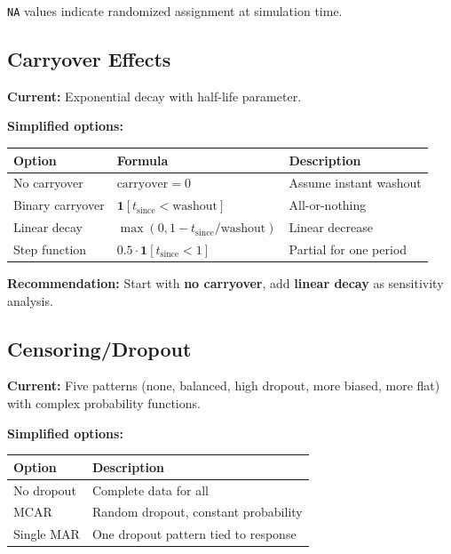 \documentclass[11pt,letterpaper]{article}
\begin{document}
\texttt{NA} values indicate randomized assignment at simulation time.


\subsection{Carryover Effects}

\textbf{Current:} Exponential decay with half-life parameter.

\textbf{Simplified options:}

\begin{table}[h]
\centering\small
\begin{tabular}{@{}L{3cm}L{5.5cm}L{4.5cm}@{}}
\toprule
Option & Formula & Description \\
\midrule
No carryover & $\text{carryover} = 0$ & Assume instant washout \\
Binary carryover & $\mathbf{1}[t_{\text{since}} < \text{washout}]$ & All-or-nothing \\
Linear decay & $\max(0, 1 - t_{\text{since}}/\text{washout})$ & Linear decrease \\
Step function & $0.5 \cdot \mathbf{1}[t_{\text{since}} < 1]$ & Partial for one period \\
\bottomrule
\end{tabular}
\end{table}

\textbf{Recommendation:} Start with \textbf{no carryover}, add
\textbf{linear decay} as sensitivity analysis.


\subsection{Censoring/Dropout}

\textbf{Current:} Five patterns (none, balanced, high dropout, more
biased, more flat) with complex probability functions.

\textbf{Simplified options:}

\begin{table}[h]
\centering
\begin{tabular}{@{}ll@{}}
\toprule
Option & Description \\
\midrule
No dropout & Complete data for all \\
MCAR & Random dropout, constant probability \\
Single MAR & One dropout pattern tied to response \\
\bottomrule
\end{tabular}
\end{table}
\end{document}
